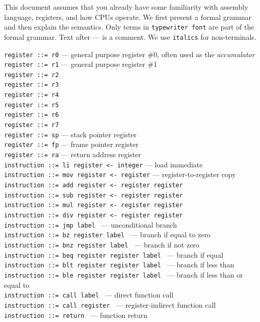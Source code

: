 \documentclass[]{article}
\begin{document}
This document assumes that you already have some familiarity with
assembly language, registers, and how CPUs operate. We first present a
formal grammar and then explain the semantics. Only terms in
\texttt{typewriter font} are part of the formal grammar. Text after ---
is a comment. We use \texttt{italics} for non-terminals.

\texttt{register ::= r0} --- general purpose register \#0, often used as
the \emph{accumulator}\\ \texttt{register ::= r1} --- general purpose
register \#1 \\ \texttt{register ::= r2}\\ \texttt{register ::= r3}\\
\texttt{register ::= r4}\\ \texttt{register ::= r5}\\
\texttt{register ::= r6}\\ \texttt{register ::= r7}\\
\texttt{register ::= sp} --- stack pointer register\\
\texttt{register ::= fp} --- frame pointer register\\
\texttt{register ::= ra} --- return address register\\

\texttt{instruction ::= li  register \textless{}- integer} --- load
immediate \\ \texttt{instruction ::= mov register \textless{}- register}
--- register-to-register copy \\
\texttt{instruction ::= add register \textless{}- register register}\\
\texttt{instruction ::= sub register \textless{}- register register}\\
\texttt{instruction ::= mul register \textless{}- register register}\\
\texttt{instruction ::= div register \textless{}- register register}\\

\texttt{instruction ::= jmp label } --- unconditional branch\\
\texttt{instruction ::= bz register label } --- branch if equal to zero
\\ \texttt{instruction ::= bnz register label } --- branch if not zero
\\ \texttt{instruction ::= beq register register label } --- branch if
equal \\ \texttt{instruction ::= blt register register label } ---
branch if less than \\
\texttt{instruction ::= ble register register label } --- branch if less
than or equal to \\ \texttt{instruction ::= call label } --- direct
function call\\ \texttt{instruction ::= call register } ---
register-indirect function call\\ \texttt{instruction ::= return } ---
function return\\
\end{document}

